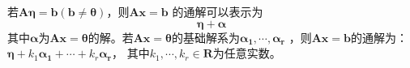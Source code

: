 \begin{theorem}
    若$\boldsymbol{A}\boldsymbol{\eta}=\boldsymbol{b}(\boldsymbol{b}\neq \boldsymbol{\theta})$，则$\boldsymbol{A}\boldsymbol{x}=\boldsymbol{b}$
    的通解可以表示为
    $$\boldsymbol{\eta}+\boldsymbol{\alpha}$$
    其中$\boldsymbol{\alpha}$为$\boldsymbol{A}\boldsymbol{x}=\boldsymbol{\theta}$的解。若$\boldsymbol{A}\boldsymbol{x}=\boldsymbol{\theta}$的基础解系为$\boldsymbol{\alpha_1},\cdots,\boldsymbol{\alpha_r}$
    ，则$\boldsymbol{A}\boldsymbol{x}=\boldsymbol{b}$的通解为：
    $\boldsymbol{\eta}+k_1\boldsymbol{\alpha_1}+\cdots+k_r\boldsymbol{\alpha_r}$，
    其中$k_1,\cdots,k_r\in \mathbf{R}$为任意实数。
\end{theorem}
